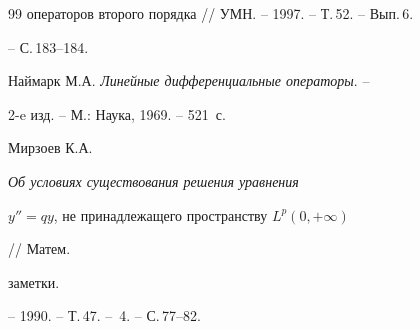 \begin{thebibliography}{99}
{операторов второго порядка} // УМН. -- 1997. -- Т.\,52. -- Вып.\,6. 


-- С.\,183--184. 




Наймарк М.А. {\em Линейные дифференциальные операторы}. -- 


2-e изд. -- М.: Наука, 1969. -- 521~с. 




Мирзоев К.А. {\em Об условиях существования решения уравнения 


$y''=q y$, не принадлежащего пространству $L^p(0,+\infty)$} // Матем. 


заметки. 


-- 1990. -- Т.\,47. -- \No\,4. -- С.\,77--82. 


 


\end{thebibliography} 


 


\vskip 2cm 


 






 


\label{end} 


 


